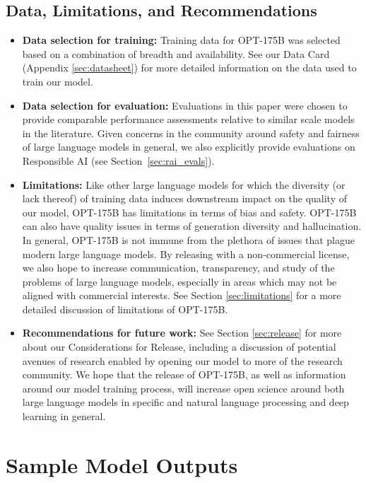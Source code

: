 \documentclass[11pt]{article}
\newcommand{\OPT}[0]{{OPT-175B}}
\begin{document}
\subsection{Data, Limitations, and Recommendations}
\begin{itemize}
    \item \textbf{Data selection for training:} Training data for \OPT{} was selected based on a combination of breadth and availability. See our Data Card (Appendix \ref{sec:datasheet}) for more detailed information on the data used to train our model. 
    \item \textbf{Data selection for evaluation:} Evaluations in this paper were chosen to provide comparable performance assessments relative to similar scale models in the literature. Given concerns in the community around safety and fairness of large language models in general, we also explicitly provide evaluations on Responsible AI (see Section~\ref{sec:rai_evals}). 
    \item \textbf{Limitations:} Like other large language models for which the diversity (or lack thereof) of training data induces downstream impact on the quality of our model, \OPT{} has limitations in terms of bias and safety. \OPT{} can also have quality issues in terms of generation diversity and hallucination. In general, \OPT{} is not immune from the plethora of issues that plague modern large language models. By releasing with a non-commercial license, we also hope to increase communication, transparency, and study of the problems of large language models, especially in areas which may not be aligned with commercial interests. See Section \ref{sec:limitations} for a more detailed discussion of limitations of \OPT{}. 
    \item \textbf{Recommendations for future work:} See Section \ref{sec:release} for more about our Considerations for Release, including a discussion of potential avenues of research enabled by opening our model to more of the research community. We hope that the release of \OPT{}, as well as information around our model training process, will increase open science around both large language models in specific and natural language processing and deep learning in general.
\end{itemize}
 


 \clearpage
\section{Sample Model Outputs}
\label{sec:model_output}
\end{document}
